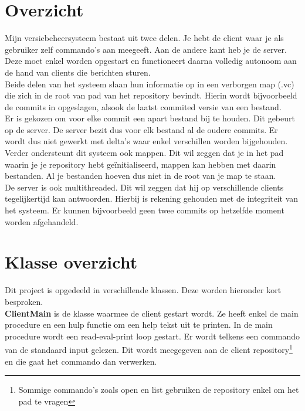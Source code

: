 \documentclass{article}
\begin{document}
\section{Overzicht}
\label{sec:overzicht}
Mijn versiebeheersysteem bestaat uit twee delen. Je hebt de client waar je als gebruiker zelf commando's aan meegeeft. Aan de andere kant heb je de server. Deze moet enkel worden opgestart en functioneert daarna volledig autonoom aan de hand van clients die berichten sturen.\\
Beide delen van het systeem slaan hun informatie op in een verborgen map (.vc) die zich in de root van pad van het repository bevindt. Hierin wordt bijvoorbeeld de commits in opgeslagen, alsook de laatst commited versie van een bestand.\\
Er is gekozen om voor elke commit een apart bestand bij te houden. Dit gebeurt op de server. De server bezit dus voor elk bestand al de oudere commits. Er wordt dus niet gewerkt met delta's waar enkel verschillen worden bijgehouden.\\
Verder ondersteunt dit systeem ook mappen. Dit wil zeggen dat je in het pad waarin je je repository hebt ge\"{i}nitialiseerd, mappen kan hebben met daarin bestanden. Al je bestanden hoeven dus niet in de root van je map te staan.\\
De server is ook multithreaded. Dit wil zeggen dat hij op verschillende clients tegelijkertijd kan antwoorden. Hierbij is rekening gehouden met de integriteit van het systeem. Er kunnen bijvoorbeeld geen twee commits op hetzelfde moment worden afgehandeld.

\section{Klasse overzicht}
\label{sec:klasoverzicht}
Dit project is opgedeeld in verschillende klassen. Deze worden hieronder kort besproken.\\

\textbf{ClientMain} is de klasse waarmee de client gestart wordt. Ze heeft enkel de main procedure en een hulp functie om een help tekst uit te printen. In de main procedure wordt een read-eval-print loop gestart. Er wordt telkens een commando van de standaard input gelezen. Dit wordt meegegeven aan de client repository\footnote{Sommige commando's zoals open en list gebruiken de repository enkel om het pad te vragen} en die gaat het commando dan verwerken.\\
\end{document}
